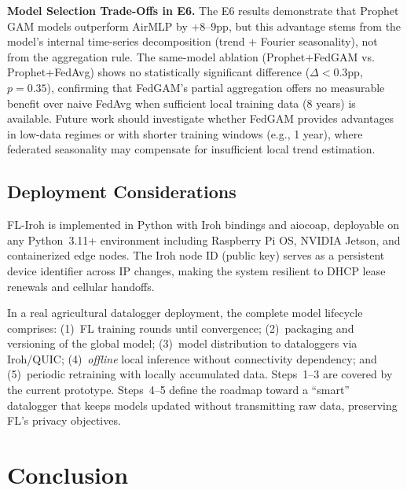 \documentclass[a4paper,fleqn]{cas-dc}
\begin{document}
\textbf{Model Selection Trade-Offs in E6.} The E6 results demonstrate that Prophet GAM models outperform AirMLP by +8--9pp, but this advantage stems from the model's internal time-series decomposition (trend + Fourier seasonality), not from the aggregation rule. The same-model ablation (Prophet+FedGAM vs. Prophet+FedAvg) shows no statistically significant difference ($\Delta{<}0.3$pp, $p{=}0.35$), confirming that FedGAM's partial aggregation offers no measurable benefit over naive FedAvg when sufficient local training data (8 years) is available. Future work should investigate whether FedGAM provides advantages in low-data regimes or with shorter training windows (e.g., 1 year), where federated seasonality may compensate for insufficient local trend estimation.

\subsection{Deployment Considerations}

FL-Iroh is implemented in Python with Iroh bindings and aiocoap, deployable on any Python~3.11+ environment including Raspberry Pi OS, NVIDIA Jetson, and containerized edge nodes. The Iroh node ID (public key) serves as a persistent device identifier across IP changes, making the system resilient to DHCP lease renewals and cellular handoffs.

In a real agricultural datalogger deployment, the complete model lifecycle comprises: (1)~FL training rounds until convergence; (2)~packaging and versioning of the global model; (3)~model distribution to dataloggers via Iroh/QUIC; (4)~\emph{offline} local inference without connectivity dependency; and (5)~periodic retraining with locally accumulated data. Steps~1--3 are covered by the current prototype. Steps~4--5 define the roadmap toward a ``smart'' datalogger that keeps models updated without transmitting raw data, preserving FL's privacy objectives.

\section{Conclusion}
\label{sec:conclusion}
\end{document}
